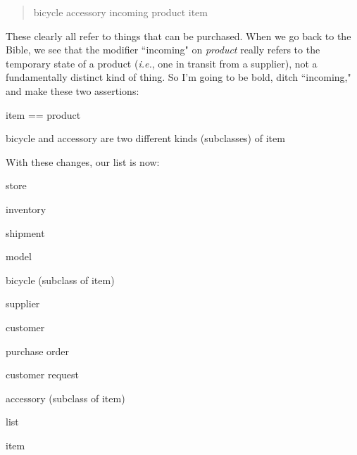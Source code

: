 \begin{itemize}
\begin{quote}
\begin{center}
\textsf{bicycle \quad \quad \quad accessory \quad \quad \quad incoming product
\quad \quad \quad
item}
\end{center}
\end{quote}

These clearly all refer to things that can be purchased. When we go back to
the Bible, we see that the modifier ``incoming" on \textit{product} really
refers to the temporary state of a product (\textit{i.e.}, one in transit from
a supplier), not a fundamentally distinct kind of thing. So I'm going to be
bold, ditch ``incoming," and make these two assertions:

\begin{compactenum}
\item \textsf{item == product}
\item \textsf{bicycle} and \textsf{accessory} are two different kinds
(subclasses) of \textsf{item}
\end{compactenum}

\end{itemize}

With these changes, our list is now:
\vspace{-.2in}
\begin{samepage}
\begin{center}
\parbox{.9\textwidth}{
\begin{multicols}{2}
\begin{compactitem}
\item \textsf{store}
\item \textsf{inventory}
\item \textsf{shipment}
\item \textsf{model}
\item \textsf{bicycle} (subclass of \textsf{item})
\item \textsf{supplier}
\columnbreak
\item \textsf{customer}
\item \textsf{purchase order}
\item \textsf{customer request}
\item \textsf{accessory} (subclass of \textsf{item})
\item \textsf{list}
\item \textsf{item}
\end{compactitem}
\end{multicols}
}
\end{center}
\end{samepage}

